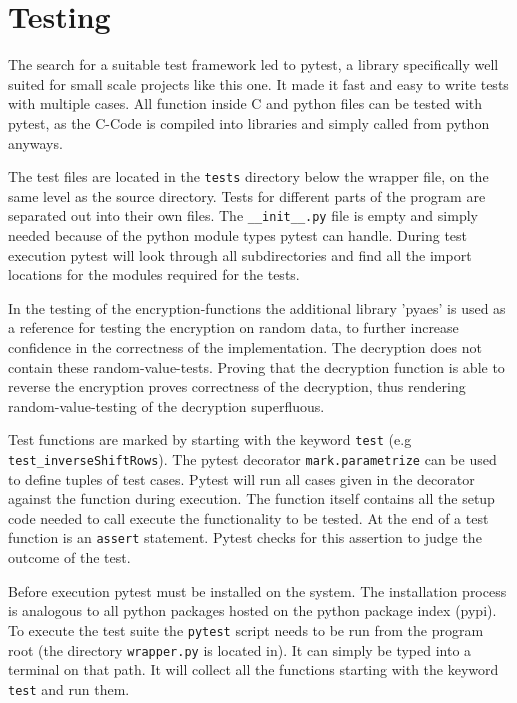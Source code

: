 \chapter{Testing}
The search for a suitable test framework led to pytest, a library specifically well suited for small scale projects like this one. It made it fast and easy to write tests with multiple cases. All function inside C and python files can be tested with pytest, as the C-Code is compiled into libraries and simply called from python anyways. \cite{pytest}

The test files are located in the \lstinline|tests| directory below the wrapper file, on the same level as the source directory. Tests for different parts of the program are separated out into their own files. The \lstinline|__init__.py| file is empty and simply needed because of the python module types pytest can handle. During test execution pytest will look through all subdirectories and find all the import locations for the modules required for the tests.

In the testing of the encryption-functions the additional library 'pyaes' is used as a reference for testing the encryption on random data, to further increase confidence in the correctness of the implementation. The decryption does not contain these random-value-tests. Proving that the decryption function is able to reverse the encryption proves correctness of the decryption, thus rendering random-value-testing of the decryption superfluous.

Test functions are marked by starting with the keyword \lstinline|test| (e.g \lstinline|test_inverseShiftRows|). The pytest decorator \lstinline|mark.parametrize| can be used to define tuples of test cases. Pytest will run all cases given in the decorator against the function during execution. The function itself contains all the setup code needed to call execute the functionality to be tested. At the end of a test function is an \lstinline|assert| statement. Pytest checks for this assertion to judge the outcome of the test.

Before execution pytest must be installed on the system. The installation process is analogous to all python packages hosted on the python package index (pypi). To execute the test suite the \lstinline|pytest| script needs to be run from the program root (the directory \lstinline|wrapper.py| is located in). It can simply be typed into a terminal on that path. It will collect all the functions starting with the keyword \lstinline|test| and run them.
